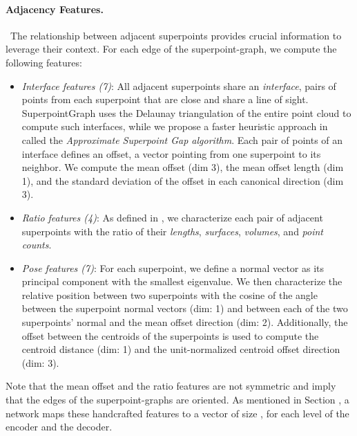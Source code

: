 \paragraph{Adjacency Features.}~The relationship between adjacent superpoints provides crucial information to leverage their context. For each edge of the superpoint-graph, we compute the  following features: \\
\begin{itemize}
\item \textit{Interface features (7)}: 
All adjacent superpoints share an \emph{interface}, \ie pairs of points from each superpoint that are close and share a line of sight. SuperpointGraph \cite{landrieu2018large} uses the Delaunay triangulation of the entire point cloud to compute such interfaces, while we propose a faster heuristic approach in  called the \emph{Approximate Superpoint Gap algorithm}. Each pair of points of an interface defines an offset, \ie a vector pointing from one superpoint to its neighbor. We compute the mean offset (dim 3), the mean offset length (dim 1), and the standard deviation of the offset in each canonical direction (dim 3).

\item \textit{Ratio features (4)}: 
As defined in \cite{landrieu2018large}, we characterize each pair of adjacent superpoints with the ratio of their \textit{lengths}, \textit{surfaces}, \textit{volumes}, and \textit{point counts}.

\item \textit{Pose features (7)}: For each superpoint, we define a normal vector as its principal component with the smallest eigenvalue. We then characterize the relative position between two superpoints with the cosine of the angle between the superpoint normal vectors (dim: 1) and between each of the two superpoints' normal and the mean offset direction (dim: 2). Additionally, the offset between the centroids of the superpoints is used to compute the centroid distance (dim: 1) and the unit-normalized centroid offset direction (dim: 3).

\end{itemize}

Note that the mean offset and the ratio features are not symmetric and imply that the edges of the superpoint-graphs are oriented.
As mentioned in Section \textcolor{red}{}, a network  maps these handcrafted features to a vector of size , for each level  of the encoder and the decoder.



